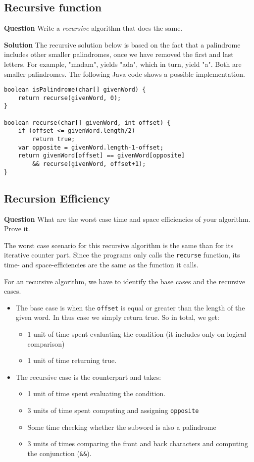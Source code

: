 \documentclass[11pt]{article}
\begin{document}
\subsection{Recursive function}
\label{sec:orgc925093}
\textbf{Question} Write a \emph{recursive} algorithm that does the same.

\textbf{Solution} The recursive solution below is based on the fact that a
palindrome includes other smaller palindromes, once we have removed
the first and last letters. For example, "madam", yields "ada",
which in turn, yield "a". Both are smaller palindromes. The
following Java code shows a possible implementation.

\begin{verbatim}
boolean isPalindrome(char[] givenWord) {
    return recurse(givenWord, 0);
}

boolean recurse(char[] givenWord, int offset) {
    if (offset <= givenWord.length/2)
        return true;
    var opposite = givenWord.length-1-offset;
    return givenWord[offset] == givenWord[opposite]
        && recurse(givenWord, offset+1);
}
\end{verbatim}

\subsection{Recursion Efficiency}
\label{sec:orgd32566e}
\textbf{Question} What are the worst case time and space efficiencies of
your algorithm. Prove it.

The worst case scenario for this recursive algorithm is the same
than for its iterative counter part. Since the programs only calls
the \texttt{recurse} function, its time- and space-efficiencies are the
same as the function it calls.

For an recursive algorithm, we have to identify the base cases and
the recursive cases.

\begin{itemize}
\item The base case is when the \texttt{offset} is equal or greater than the
length of the given word. In thus case we simply return true. So
in total, we get:
\begin{itemize}
\item 1 unit of time spent evaluating the condition (it includes
only on logical comparison)
\item 1 unit of time returning true.
\end{itemize}
\item The recursive case is the counterpart and takes:
\begin{itemize}
\item 1 unit of time spent evaluating the condition.
\item 3 units of time spent computing and assigning \texttt{opposite}
\item Some time checking whether the subword is also a palindrome
\item 3 units of times comparing the front and back characters and
computing the conjunction (\texttt{\&\&}).
\end{itemize}
\end{itemize}
\end{document}
